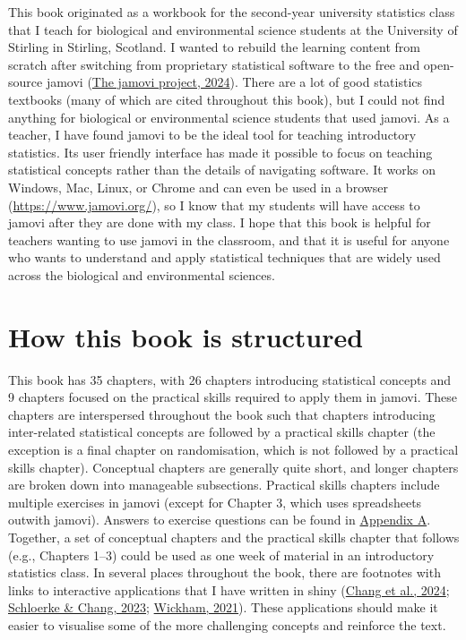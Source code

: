 \documentclass[
  openany]{krantz}
\begin{document}
This book originated as a workbook for the second-year university statistics class that I teach for biological and environmental science students at the University of Stirling in Stirling, Scotland.
I wanted to rebuild the learning content from scratch after switching from proprietary statistical software to the free and open-source jamovi (\protect\hyperlink{ref-Jamovi2022}{The jamovi project, 2024}).
There are a lot of good statistics textbooks (many of which are cited throughout this book), but I could not find anything for biological or environmental science students that used jamovi.
As a teacher, I have found jamovi to be the ideal tool for teaching introductory statistics.
Its user friendly interface has made it possible to focus on teaching statistical concepts rather than the details of navigating software.
It works on Windows, Mac, Linux, or Chrome and can even be used in a browser (\url{https://www.jamovi.org/}), so I know that my students will have access to jamovi after they are done with my class.
I hope that this book is helpful for teachers wanting to use jamovi in the classroom, and that it is useful for anyone who wants to understand and apply statistical techniques that are widely used across the biological and environmental sciences.

\hypertarget{structure}{%
\section*{How this book is structured}\label{structure}}


This book has 35 chapters, with 26 chapters introducing statistical concepts and 9 chapters focused on the practical skills required to apply them in jamovi.
These chapters are interspersed throughout the book such that chapters introducing inter-related statistical concepts are followed by a practical skills chapter (the exception is a final chapter on randomisation, which is not followed by a practical skills chapter).
Conceptual chapters are generally quite short, and longer chapters are broken down into manageable subsections.
Practical skills chapters include multiple exercises in jamovi (except for Chapter 3, which uses spreadsheets outwith jamovi).
Answers to exercise questions can be found in \protect\hyperlink{appendexA}{Appendix A}.
Together, a set of conceptual chapters and the practical skills chapter that follows (e.g., Chapters 1--3) could be used as one week of material in an introductory statistics class.
In several places throughout the book, there are footnotes with links to interactive applications that I have written in shiny (\protect\hyperlink{ref-Rshiny}{Chang et al., 2024}; \protect\hyperlink{ref-Barret2023}{Schloerke \& Chang, 2023}; \protect\hyperlink{ref-Wickham2021}{Wickham, 2021}).
These applications should make it easier to visualise some of the more challenging concepts and reinforce the text.
\end{document}
